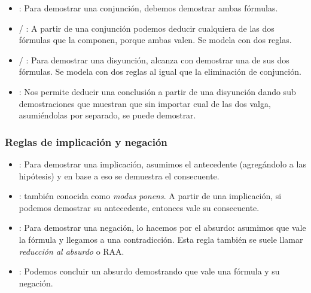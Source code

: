 \begin{multicols}{2}
    \proofTreeAndEOne
    \proofTreeAndETwo
\end{multicols}

\begin{multicols}{2}
    \proofTreeOrIOne
    \proofTreeOrITwo
\end{multicols}

\proofTreeOrE

\begin{itemize}
    \item {}: Para demostrar una conjunción, debemos demostrar ambas fórmulas.
    \item {} / : A partir de una conjunción podemos
    deducir cualquiera de las dos fórmulas que la componen, porque ambas valen.
    Se modela con dos reglas.
    \item {} / : Para demostrar una disyunción, alcanza con
    demostrar una de sus dos fórmulas. Se modela con dos reglas al igual que la
    eliminación de conjunción.
    \item {}: Nos permite deducir una conclusión a partir de una
    disyunción dando sub demostraciones que muestran que sin importar cual de
    las dos valga, asumiéndolas por separado, se puede demostrar.
\end{itemize}

\subsubsection{Reglas de implicación y negación}

\begin{multicols}{2}
    \proofTreeImpI
    \proofTreeImpE
\end{multicols}

\proofSpacing

\begin{multicols}{2}
    \proofTreeNotI
    \proofTreeNotE
\end{multicols}

\begin{itemize}
    \item {}: Para demostrar una implicación, asumimos el antecedente
    (agregándolo a las hipótesis) y en base a eso se demuestra el consecuente.
    \item {}: también conocida como \textit{modus ponens}. A partir de
    una implicación, si podemos demostrar su antecedente, entonces vale su consecuente.
    \item {}: Para demostrar una negación, lo hacemos por el absurdo:
    asumimos que vale la fórmula y llegamos a una contradicción. Esta regla
    también se suele llamar \textit{reducción al absurdo} o RAA.
    \item {}: Podemos concluir un absurdo demostrando que vale una
    fórmula y su negación.
\end{itemize}

